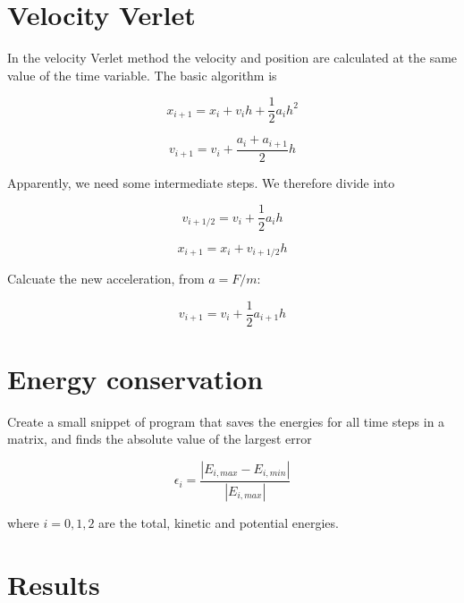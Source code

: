 \documentclass[11pt]{article}
\begin{document}
\section{Velocity Verlet}

\begin{flushleft}
In the velocity Verlet method the velocity and position are calculated at the same value of the time variable. The basic algorithm is

\begin{equation}
x_{i+1} = x_i + v_i h + \frac{1}{2} a_i h^2
\end{equation}

\begin{equation}
v_{i+1} = v_i + \frac{a_i + a_{i+1}}{2}h
\end{equation}

Apparently, we need some intermediate steps. We therefore divide into 

\begin{equation}
v_{i+1/2} = v_i + \frac{1}{2} a_i h
\end{equation}

\begin{equation}
x_{i+1} = x_i + v_{i+1/2} h
\end{equation}

Calcuate the new acceleration, from $a = F/m$:

\begin{equation}
v_{i+1} = v_i + \frac{1}{2} a_{i+1} h
\end{equation}

\section{Energy conservation}

\begin{flushleft}
Create a small snippet of program that saves the energies for all time steps in a matrix, and finds the absolute value of the largest error

\begin{equation}
\epsilon_i = \frac{|E_{i, max} - E_{i, min}|}{|E_{i, max}|}
\end{equation}

where $i=0,1,2$ are the total, kinetic and potential energies.
\end{flushleft}

\section{Results}


\end{flushleft}
\end{document}
